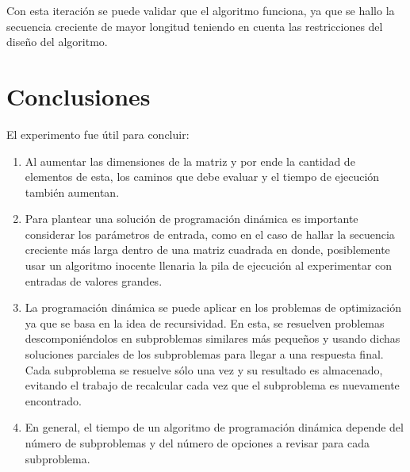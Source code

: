 \documentclass[letter]{article}
\begin{document}
Con esta iteración se puede validar que el algoritmo funciona, ya que se hallo la secuencia creciente de mayor longitud teniendo en cuenta las restricciones del diseño del algoritmo.

\section{Conclusiones}
El experimento fue útil para concluir:
\begin{enumerate}
    \item Al aumentar las dimensiones de la matriz y por ende la cantidad de elementos de esta, los caminos que debe evaluar y el tiempo de ejecución también aumentan.
    \item Para plantear una solución de programación dinámica es importante considerar los parámetros de entrada, como en el caso de hallar la secuencia creciente más larga dentro de una matriz cuadrada  en donde, posiblemente usar un algoritmo inocente llenaria la pila de ejecución al experimentar con entradas de valores grandes.
    \item La programación dinámica se puede aplicar en los problemas de optimización ya que se basa en la idea de recursividad. En esta, se resuelven problemas descomponiéndolos en subproblemas similares más pequeños y usando dichas soluciones parciales de los subproblemas para llegar a una respuesta final. Cada subproblema se resuelve sólo una vez y su resultado es almacenado, evitando el trabajo de recalcular cada vez que el subproblema es nuevamente encontrado.

    \item En general, el tiempo de un algoritmo de programación dinámica depende del número de subproblemas y del número de opciones a revisar para cada subproblema.
\end{enumerate}
\end{document}
